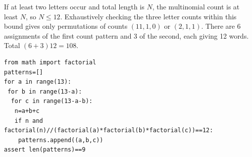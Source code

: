 If at least two letters occur and total length is $N$, the multinomial count is at least $N$, so $N\le12$. Exhaustively checking the three letter counts within this bound gives only permutations of counts $(11,1,0)$ or $(2,1,1)$. There are 6 assignments of the first count pattern and 3 of the second, each giving 12 words. Total $(6+3)12=\boxed{108}$.\begin{verbatim}
from math import factorial
patterns=[]
for a in range(13):
 for b in range(13-a):
  for c in range(13-a-b):
   n=a+b+c
   if n and factorial(n)//(factorial(a)*factorial(b)*factorial(c))==12:
    patterns.append((a,b,c))
assert len(patterns)==9
\end{verbatim}
